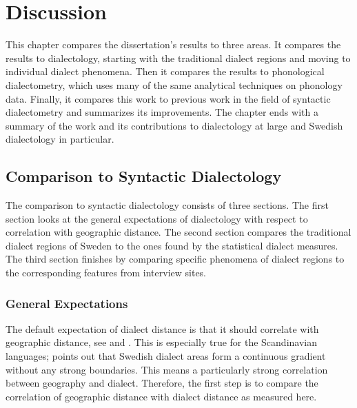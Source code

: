 \chapter{Discussion}
\label{discussion-chapter}

This chapter compares the dissertation's results to three areas. It
compares the results to dialectology, starting with the traditional
dialect regions and moving to individual dialect phenomena. Then it
compares the results to phonological dialectometry, which uses many of
the same analytical techniques on phonology data. Finally, it compares
this work to previous work in the field of syntactic dialectometry and
summarizes its improvements. The chapter ends with a summary of the
work and its contributions to dialectology at large and Swedish
dialectology in particular.



\section{Comparison to Syntactic Dialectology}

The comparison to syntactic dialectology consists of three
sections. The first section looks at the general expectations of
dialectology with respect to correlation with geographic distance. The
second section compares the traditional dialect regions of Sweden to
the ones found by the statistical dialect measures. The third section
finishes by comparing specific phenomena of dialect regions to the
corresponding features from interview sites.

\subsection{General Expectations}

The default expectation of dialect distance is that it should
correlate with geographic distance, see  and
. This is especially true for the Scandinavian
languages;  points out that Swedish dialect areas
form a continuous gradient without any strong boundaries. This means a
particularly strong correlation between geography and
dialect. Therefore, the first step is to compare the correlation of
geographic distance with dialect distance as measured
here.

